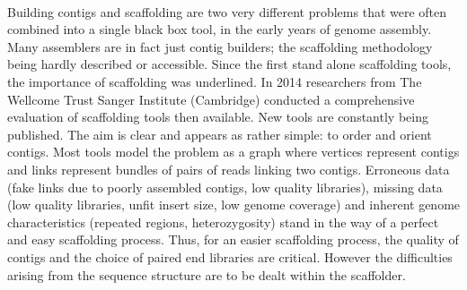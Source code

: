 \documentclass[12pt]{report}
\begin{document}
\begin{figure}[ht]
\end{figure}\\
Building contigs and scaffolding are two very different problems that were often combined into a single black box tool, in the early years of genome assembly. Many assemblers are in fact just contig builders; the scaffolding methodology being hardly described or accessible. Since the first stand alone scaffolding tools, the importance of scaffolding was underlined. In 2014 researchers from The Wellcome Trust Sanger Institute (Cambridge) conducted a comprehensive evaluation of scaffolding tools then available. New tools are constantly being published. The aim is clear and appears as rather simple: to order and orient contigs. Most tools model the problem as a graph where vertices represent contigs and links represent bundles of pairs of reads linking two contigs. Erroneous data (fake links due to poorly assembled contigs, low quality libraries), missing data (low quality libraries, unfit insert size, low genome coverage) and inherent genome characteristics (repeated regions,  heterozygosity) stand in the way of a perfect and easy scaffolding process. Thus, for an easier scaffolding process, the quality of contigs and the choice of paired end libraries are critical. However the difficulties arising from the sequence structure are to be dealt within the scaffolder.
\end{document}
